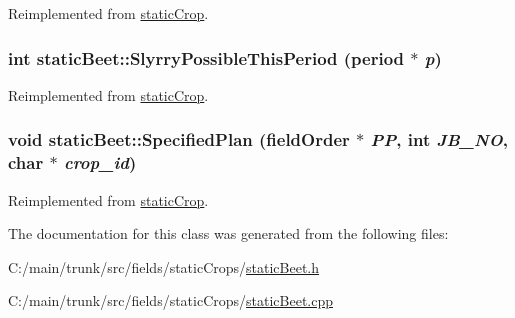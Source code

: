 Reimplemented from \hyperlink{classstatic_crop_ae4f07498c1616eab212386faf352d348}{staticCrop}.\hypertarget{classstatic_beet_ac4c74287080f0312d824b0f0bc493b70}{
\subsubsection[{SlyrryPossibleThisPeriod}]{\setlength{\rightskip}{0pt plus 5cm}int staticBeet::SlyrryPossibleThisPeriod ({\bf period} $\ast$ {\em p})}}
\label{classstatic_beet_ac4c74287080f0312d824b0f0bc493b70}


Reimplemented from \hyperlink{classstatic_crop_ada7c8c797de629277a5ba0b0a4a3c17e}{staticCrop}.\hypertarget{classstatic_beet_a5ee0ed20286108fd34901d74099de424}{
\subsubsection[{SpecifiedPlan}]{\setlength{\rightskip}{0pt plus 5cm}void staticBeet::SpecifiedPlan ({\bf fieldOrder} $\ast$ {\em PP}, \/  int {\em JB\_\-NO}, \/  char $\ast$ {\em crop\_\-id})}}
\label{classstatic_beet_a5ee0ed20286108fd34901d74099de424}


Reimplemented from \hyperlink{classstatic_crop_af19d8a1e4f4833325f6712c22ede8b45}{staticCrop}.

The documentation for this class was generated from the following files:\begin{DoxyCompactItemize}
\item 
C:/main/trunk/src/fields/staticCrops/\hyperlink{static_beet_8h}{staticBeet.h}\item 
C:/main/trunk/src/fields/staticCrops/\hyperlink{static_beet_8cpp}{staticBeet.cpp}\end{DoxyCompactItemize}

